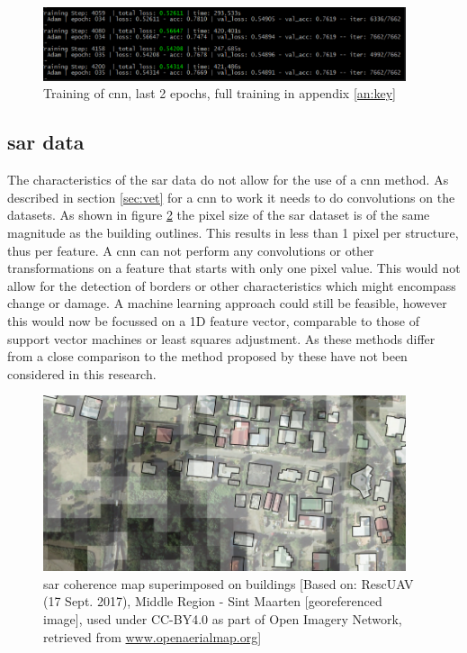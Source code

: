 \begin{figure} [H]
	\centering
	\captionsetup{justification=raggedright,singlelinecheck=false}
	\includegraphics[width=0.95\textwidth]{figs/Epoch3435.png}
	\caption{\footnotesize{Training of \ac{cnn}, last 2 epochs, full training in appendix \ref{an:key}}}
	\label{fig:epoch}
\end{figure}

\subsection{\ac{sar} data} 
The characteristics of the \ac{sar} data do not allow for the use of a \ac{cnn} method. As described in section \ref{sec:vet} for a \ac{cnn} to work it needs to do convolutions on the datasets. As shown in figure \ref{fig:sarbui} the pixel size of the \ac{sar} dataset is of the same magnitude as the building outlines. This results in less than 1 pixel per structure, thus per feature. A \ac{cnn} can not perform any convolutions or other transformations on a feature that starts with only one pixel value. This would not allow for the detection of borders or other characteristics which might encompass change or damage. A machine learning approach could still be feasible, however this would now be focussed on a 1D feature vector, comparable to those of support vector machines or least squares adjustment. As these methods differ from a close comparison to the method proposed by \citet{Vetrivel2016b} these have not been considered in this research.
\begin{figure} [H]
	\centering
	\captionsetup{justification=raggedright,singlelinecheck=false}
	\includegraphics[width=0.95\textwidth]{figs/superim.png}
	\caption{\footnotesize{\ac{sar} coherence map superimposed on buildings [Based on: RescUAV (17 Sept. 2017), Middle Region - Sint Maarten [georeferenced image], used under CC-BY4.0 as part of Open Imagery Network, retrieved from \url{www.openaerialmap.org}]}}
	\label{fig:sarbui}
\end{figure}
